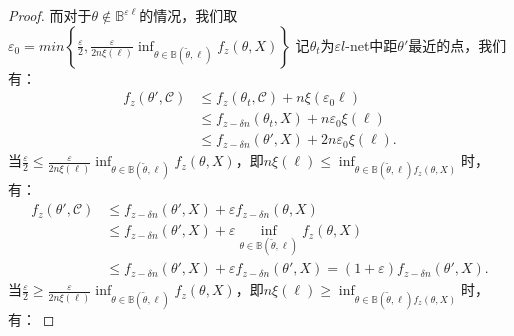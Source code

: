 \begin{proof}
而对于$\theta\notin\mathbb{B}^{\varepsilon \ell}$的情况，我们取$\varepsilon_0=min\left\{\frac{\varepsilon}{2}, \frac{\varepsilon}{2n\xi(\ell)}\inf_{\theta\in\mathbb{B}(\tilde{\theta},\ell)}f_z(\theta,X)\right\}$
记$\theta_t$为$\varepsilon l$-net中距$\theta'$最近的点，我们有：
\begin{align*}
    f_z(\theta',\mathcal{C})&\leq f_z(\theta_t,\mathcal{C})+n\xi(\varepsilon_0\ell)\\
    &\leq f_{z-\delta n}(\theta_t,X)+n\varepsilon_0\xi(\ell)\\
    &\leq f_{z-\delta n}(\theta',X)+2n\varepsilon_0\xi(\ell).
\end{align*}
当$\frac\varepsilon 2 \le \frac{\varepsilon}{2n\xi(\ell)}\inf_{\theta\in\mathbb{B}(\tilde{\theta},\ell)}f_z(\theta,X)$，即$n\xi(\ell)\le\inf_{\theta\in\mathbb{B}(\tilde{\theta},\ell)f_z(\theta,X)}$时，有：
\begin{align*}
    f_z(\theta',\mathcal{C})&\leq f_{z-\delta n}(\theta',X)+\varepsilon f_{z-\delta n}(\theta,X)\\
    &\leq f_{z-\delta n}(\theta',X)+\varepsilon \inf_{\theta\in\mathbb{B}(\tilde{\theta},\ell)}f_z(\theta,X)\\
    &\leq f_{z-\delta n}(\theta',X)+\varepsilon f_{z-\delta n}(\theta',X)=(1+\varepsilon)f_{z-\delta n}(\theta',X).
\end{align*}
当$\frac\varepsilon 2 \ge \frac{\varepsilon}{2n\xi(\ell)}\inf_{\theta\in\mathbb{B}(\tilde{\theta},\ell)}f_z(\theta,X)$，即$n\xi(\ell)\ge\inf_{\theta\in\mathbb{B}(\tilde{\theta},\ell)f_z(\theta,X)}$时，有：
\end{proof}
